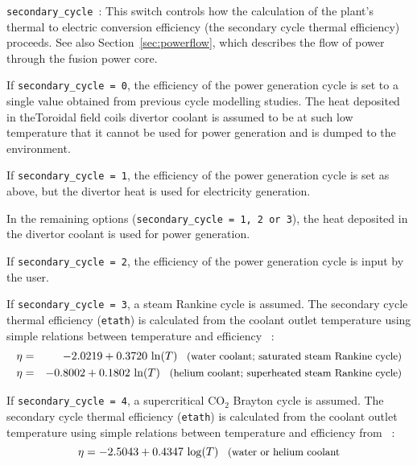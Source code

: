 \documentclass[11pt,a4paper]{report}
\begin{document}
\begin{description}
\item{\texttt{secondary\_cycle }:} This switch controls how the calculation of the plant's thermal to electric conversion efficiency (the secondary cycle thermal efficiency) proceeds. See also Section~\ref{sec:powerflow}, which describes the flow of power through the fusion power core.

If \texttt{secondary\_cycle = 0}, the efficiency of the power generation cycle is set to a single value obtained from previous cycle modelling studies.  The heat deposited in theToroidal field coils divertor coolant is assumed to be at such low temperature that it cannot be used for power generation and is dumped to the environment.

If \texttt{secondary\_cycle = 1}, the efficiency of the power generation cycle is set as above, but the divertor heat is used for electricity generation.

In the remaining options (\texttt{secondary\_cycle = 1, 2 or 3}), the heat deposited in the divertor coolant is used for power generation.

If \texttt{secondary\_cycle = 2}, the efficiency of the power generation cycle is input by the user.

If \texttt{secondary\_cycle = 3}, a steam Rankine cycle is assumed.  The secondary cycle thermal efficiency (\texttt{etath}) is calculated from the coolant outlet temperature using simple relations between temperature and efficiency ~\cite{Harrington_bop}:
\begin{eqnarray}
\eta & = & -2.0219 + 0.3720 \, \ln(T) \;\;\; \mbox{\small(water coolant;
  saturated steam Rankine cycle)} \\
\eta & = & -0.8002 + 0.1802 \, \ln(T) \;\;\; \mbox{\small(helium coolant;
  superheated steam Rankine cycle)}
\end{eqnarray}

If \texttt{secondary\_cycle = 4}, a supercritical CO$_2$ Brayton cycle is assumed.  The secondary cycle thermal efficiency (\texttt{etath}) is calculated from the coolant outlet temperature using simple relations between temperature and efficiency from ~\cite{Harrington_bop}:
\begin{equation}
\eta = -2.5043 + 0.4347 \, \log(T) \;\;\; \mbox{\small(water or
  helium coolant}
\end{equation}
  
\end{description}
\end{document}
